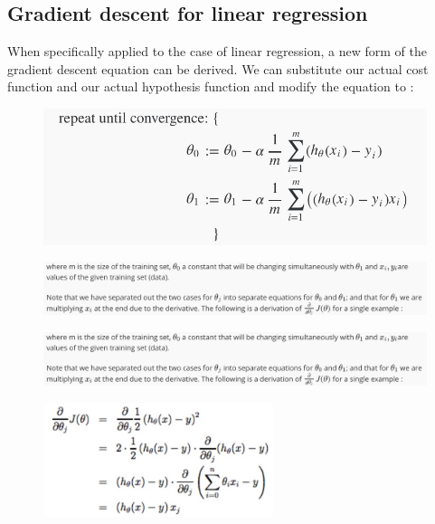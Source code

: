 \documentclass[12pt, A4,onecolumn]{article} %
\begin{document}
\subsection{Gradient descent for linear regression}

When specifically applied to the case of linear regression, a new form of the gradient descent equation can be derived. We can substitute our actual cost function and our actual hypothesis function and modify the equation to :
\begin{figure}[H]
	\centering
	\includegraphics[width=1\textwidth]{./Imagenes/gradient12}
\end{figure}

\begin{figure}[H]
	\centering
	\includegraphics[width=1\textwidth]{./Imagenes/gradient13}
\end{figure}

\begin{figure}[H]
	\centering
	\includegraphics[width=1\textwidth]{./Imagenes/gradient13}
\end{figure}

\begin{figure}[H]
	\centering
	\includegraphics[width=0.6\textwidth]{./Imagenes/gradient14}
\end{figure}
\end{document}
